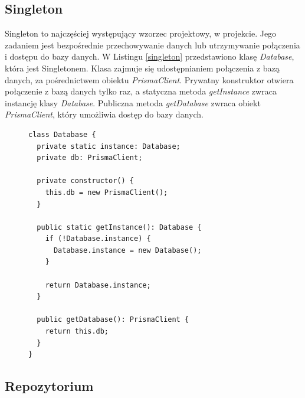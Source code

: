 \documentclass[a4paper,12pt]{book}
\begin{document}
\subsection{Singleton}
Singleton to najczęściej występujący wzorzec projektowy, w projekcie. Jego zadaniem jest bezpośrednie przechowywanie danych lub utrzymywanie połączenia i dostępu do bazy danych. W Listingu \ref{singleton} przedstawiono klasę \textit{Database}, która jest Singletonem. Klasa zajmuje się udostępnianiem połączenia z bazą danych, za pośrednictwem obiektu \textit{PrismaClient}. Prywatny konstruktor otwiera połączenie z bazą danych tylko raz, a statyczna metoda \textit{getInstance} zwraca instancję klasy \textit{Database}. Publiczna metoda \textit{getDatabase} zwraca obiekt \textit{PrismaClient}, który umożliwia dostęp do bazy danych.
\begin{figure}  
  \centering
\begin{lstlisting}[style=ES6, caption={Klasa \textit{Database}. Singleton.}, label={singleton}]
class Database {
  private static instance: Database;
  private db: PrismaClient;

  private constructor() {
    this.db = new PrismaClient();
  }

  public static getInstance(): Database {
    if (!Database.instance) {
      Database.instance = new Database();
    }

    return Database.instance;
  }

  public getDatabase(): PrismaClient {
    return this.db;
  }
}
\end{lstlisting}
\end{figure}

\subsection{Repozytorium}
\end{document}
